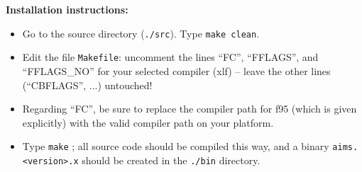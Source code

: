 \textbf{Installation instructions:}
\begin{itemize}
  \item Go to the source directory (\texttt{./src}). Type \texttt{make
    clean}. 
  \item Edit the file
    \texttt{Makefile}: uncomment the lines ``FC'', ``FFLAGS'', and
    ``FFLAGS\_NO'' for your selected compiler (xlf) -- leave the other lines
    (``CBFLAGS'', ...) untouched!
  \item Regarding ``FC'', be sure to replace the compiler path for f95 (which
    is given explicitly) with the valid compiler path on your platform. 
  \item Type \texttt{make} ; all source code should be compiled this way, and
    a binary \texttt{aims.<version>.x} should be created in the
    \texttt{./bin} directory.
\end{itemize}

